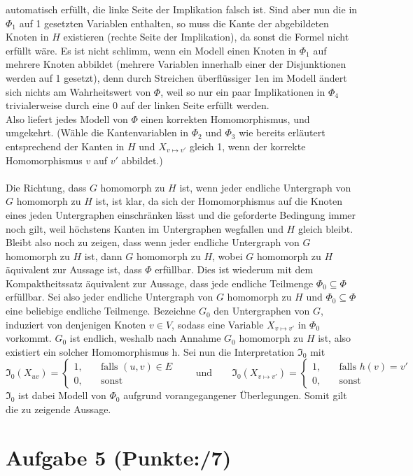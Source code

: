 \documentclass[11pt, a4paper]{article}
\newcommand{\pppp}{7}
\begin{document}
\begin{adjustwidth}{20pt}{20pt}
automatisch erfüllt, die linke Seite der Implikation falsch ist. Sind aber nun die in $\Phi_1$ auf 1 gesetzten Variablen enthalten, so muss die Kante der abgebildeten Knoten in
$H$ existieren (rechte Seite der Implikation), da sonst die Formel nicht erfüllt wäre. Es ist nicht schlimm, wenn ein Modell einen Knoten in $\Phi_1$ auf mehrere Knoten abbildet (mehrere
Variablen innerhalb einer der Disjunktionen werden auf 1 gesetzt), denn durch Streichen überflüssiger 1en im Modell ändert sich nichts am Wahrheitswert von $\Phi$, weil
so nur ein paar Implikationen in $\Phi_4$ trivialerweise durch eine 0 auf der linken Seite erfüllt werden.\\
Also liefert jedes Modell von $\Phi$ einen korrekten Homomorphismus, und umgekehrt. (Wähle die Kantenvariablen in $\Phi_2$ und $\Phi_3$ wie bereits erläutert entsprechend
der Kanten in $H$ und $X_{v\mapsto v'}$ gleich 1, wenn der korrekte Homomorphismus $v$ auf $v'$ abbildet.)\\ \ \\
Die Richtung, dass $G$ homomorph zu $H$ ist, wenn jeder endliche Untergraph von $G$ homomorph zu $H$ ist, ist klar, da sich der Homomorphismus auf die Knoten eines jeden
Untergraphen einschränken lässt und die geforderte Bedingung immer noch gilt, weil höchstens Kanten im Untergraphen wegfallen und $H$ gleich bleibt.\\
Bleibt also noch zu zeigen, dass wenn jeder endliche Untergraph von $G$ homomorph zu $H$ ist, dann $G$ homomorph zu $H$, wobei $G$ homomorph zu $H$ äquivalent zur Aussage
ist, dass $\Phi$ erfüllbar. Dies ist wiederum mit dem Kompaktheitssatz äquivalent zur Aussage, dass jede endliche Teilmenge $\Phi_0 \subseteq \Phi$ erfüllbar. Sei also jeder endliche
Untergraph von $G$ homomorph zu $H$ und $\Phi_0 \subseteq \Phi$ eine beliebige endliche Teilmenge. Bezeichne $G_0$ den Untergraphen von $G$, induziert von denjenigen Knoten
$v \in V$, sodass eine Variable $X_{v\mapsto v'}$ in $\Phi_0$ vorkommt. $G_0$ ist endlich, weshalb nach Annahme $G_0$ homomorph zu $H$ ist, also existiert ein solcher Homomorphismus h.
Sei nun die Interpretation $\mathfrak{I_0}$ mit 
\[
	\mathfrak{I_0}(X_{uv})=
		\begin{cases}
		1, &\quad \text{falls } (u,v) \in E\\
		0, &\quad \text{sonst}
		\end{cases}
	\qquad \text{und} \qquad
	\mathfrak{I_0}(X_{v\mapsto v'})=
		\begin{cases}
		1, &\quad \text{falls } h(v)=v'\\
		0, &\quad \text{sonst}
		\end{cases}
\]
$\mathfrak{I_0}$ ist dabei Modell von $\Phi_0$ aufgrund vorangegangener Überlegungen. Somit gilt die zu zeigende Aussage.

\end{adjustwidth}


\section*{Aufgabe 5 (Punkte:\qquad/\pppp)}
\begin{adjustwidth}{20pt}{20pt}

\end{adjustwidth}
\end{document}
